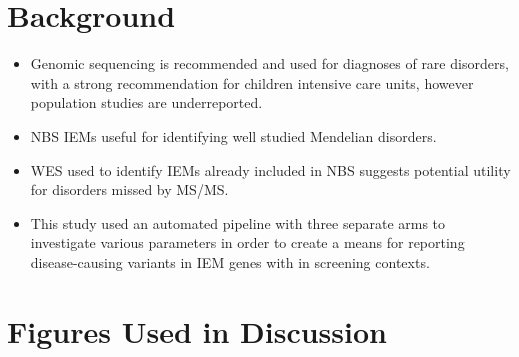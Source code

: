 \documentclass[plain,basic]{inVerba-notes}
\begin{document}
\section{Background}
\begin{itemize}
    \item Genomic sequencing is recommended and used for diagnoses of rare disorders, with a strong recommendation for children intensive care units, however population studies are underreported. 
    \item NBS IEMs useful for identifying well studied Mendelian disorders.
    \item WES used to identify IEMs already included in NBS suggests potential utility for disorders missed by MS/MS\@.
    \item This study used an automated pipeline with three separate arms to investigate various parameters in order to create a means for reporting disease-causing variants in IEM genes with in screening contexts.
\end{itemize}

\clearpage 
\section{Figures Used in Discussion}
\end{document}
